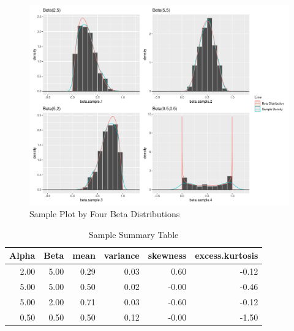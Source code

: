 \documentclass{article}\usepackage[]{graphicx}\usepackage[]{xcolor}
\makeatletter
\def\maxwidth{ %
  \ifdim\Gin@nat@width>\linewidth
    \linewidth
  \else
    \Gin@nat@width
  \fi
}
\newenvironment{knitrout}{}{} %
\makeatother
\begin{document}
\begin{figure}[H]
\begin{center}
\begin{knitrout}
\color{fgcolor}

{\centering \includegraphics[width=\maxwidth]{figure/unnamed-chunk-8-1} 

}


\end{knitrout}
\caption{Sample Plot by Four Beta Distributions \citep{e1071}}
\label{plot2} 
\end{center}
\end{figure}

\begin{table}[H]
\centering
\begingroup\small
\begin{tabular}{rrrrrr}
  \hline
Alpha & Beta & mean & variance & skewness & excess.kurtosis \\ 
  \hline
2.00 & 5.00 & 0.29 & 0.03 & 0.60 & -0.12 \\ 
  5.00 & 5.00 & 0.50 & 0.02 & -0.00 & -0.46 \\ 
  5.00 & 2.00 & 0.71 & 0.03 & -0.60 & -0.12 \\ 
  0.50 & 0.50 & 0.50 & 0.12 & -0.00 & -1.50 \\ 
   \hline
\end{tabular}
\endgroup
\caption{Sample Summary Table} 
\label{Table 3}
\end{table}
\end{document}
